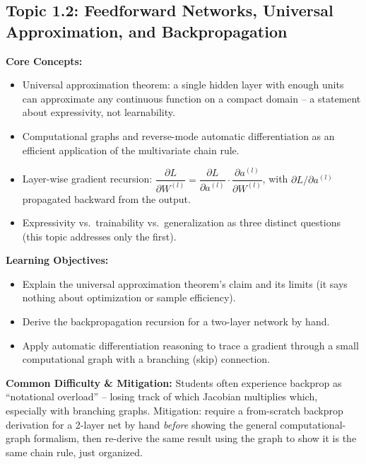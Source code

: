 \documentclass[11pt]{article}
\begin{document}
\subsection{Topic 1.2: Feedforward Networks, Universal Approximation, and Backpropagation}

\textbf{Core Concepts:}
\begin{itemize}
  \item Universal approximation theorem: a single hidden layer with enough units can approximate any continuous function on a compact domain -- a statement about expressivity, not learnability.
  \item Computational graphs and reverse-mode automatic differentiation as an efficient application of the multivariate chain rule.
  \item Layer-wise gradient recursion: $\dfrac{\partial L}{\partial W^{(l)}} = \dfrac{\partial L}{\partial a^{(l)}} \cdot \dfrac{\partial a^{(l)}}{\partial W^{(l)}}$, with $\partial L/\partial a^{(l)}$ propagated backward from the output.
  \item Expressivity vs.\ trainability vs.\ generalization as three distinct questions (this topic addresses only the first).
\end{itemize}

\textbf{Learning Objectives:}
\begin{itemize}
  \item Explain the universal approximation theorem's claim and its limits (it says nothing about optimization or sample efficiency).
  \item Derive the backpropagation recursion for a two-layer network by hand.
  \item Apply automatic differentiation reasoning to trace a gradient through a small computational graph with a branching (skip) connection.
\end{itemize}

\textbf{Common Difficulty \& Mitigation:} Students often experience backprop as ``notational overload'' -- losing track of which Jacobian multiplies which, especially with branching graphs. Mitigation: require a from-scratch backprop derivation for a 2-layer net by hand \emph{before} showing the general computational-graph formalism, then re-derive the same result using the graph to show it is the same chain rule, just organized.
\end{document}
